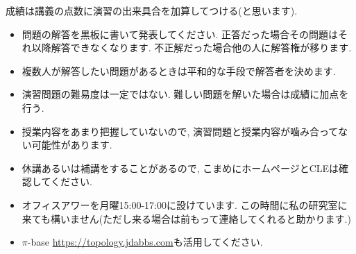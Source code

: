 \documentclass[dvipdfmx,a4paper,11pt]{article}
\theoremstyle{definition}
\begin{document}
成績は講義の点数に演習の出来具合を加算してつける(と思います).

\vspace{11pt}
\hspace{-18pt}{\large 解答の仕方について}
\begin{itemize}
  \setlength{\parskip}{0cm} %
  \setlength{\itemsep}{0cm} %
  \item 問題の解答を黒板に書いて発表してください. 正答だった場合その問題はそれ以降解答できなくなります. 不正解だった場合他の人に解答権が移ります. 
  \item 複数人が解答したい問題があるときは平和的な手段で解答者を決めます. 
  \item 演習問題の難易度は一定ではない. 難しい問題を解いた場合は成績に加点を行う. 
 \end{itemize}


\vspace{11pt}
\hspace{-18pt}{\large その他}
\begin{itemize}
  \setlength{\parskip}{0cm} %
  \setlength{\itemsep}{0cm} %
    \item 授業内容をあまり把握していないので, 演習問題と授業内容が噛み合ってない可能性があります.
  \item 休講あるいは補講をすることがあるので, こまめにホームページとCLEは確認してください.
    \item オフィスアワーを月曜15:00-17:00に設けています. この時間に私の研究室に来ても構いません(ただし来る場合は前もって連絡してくれると助かります.)
    \item $\pi$-base \url{https://topology.jdabbs.com}も活用してください. 
 \end{itemize}
 
\end{document}
